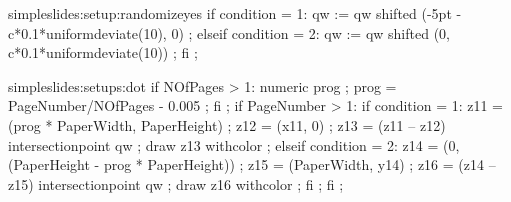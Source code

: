 



\unprotect


\startsetups simpleslides:setup:randomizeyes
if condition = 1:
  qw := qw shifted (-5pt - c*0.1*uniformdeviate(10), 0) ; 
elseif condition = 2:
  qw := qw shifted (0, c*0.1*uniformdeviate(10)) ; 
fi ;
\stopuseMPgraphic
\stopsetups

\startsetups simpleslides:setups:dot
if NOfPages > 1:
  numeric prog ; prog = PageNumber/NOfPages - 0.005 ;
fi ;
if PageNumber > 1:
  if condition = 1:
    z11 = (prog * PaperWidth, PaperHeight) ;
    z12 = (x11, 0) ;
    z13 = (z11 -- z12) intersectionpoint qw ;
    draw z13 withcolor  ;
  elseif condition = 2:
    z14 = (0, (PaperHeight - prog * PaperHeight)) ;
    z15 = (PaperWidth, y14) ;
    z16 = (z14 -- z15) intersectionpoint qw ;
    draw z16 withcolor  ;
  fi ;
fi ;
\stopuseMPgraphic
\stopsetups

